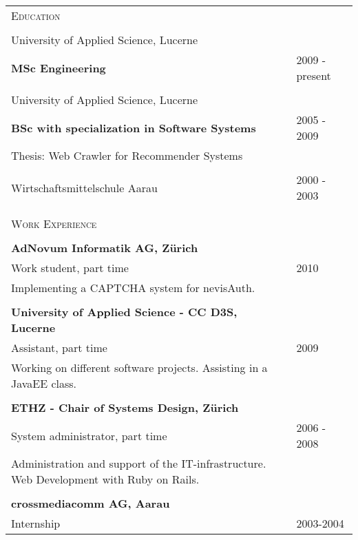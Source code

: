 \begin{table}[H]
    \centering
    \begin{tabular}{  l  l  }

        \textsc{Education} & \\
        \\
        University of Applied Science, Lucerne & \\
        \textbf{MSc Engineering} & 2009 - present   \\
        
        \\
        
        University of Applied Science, Lucerne & \\
        \textbf{BSc with specialization in Software Systems} & 2005 - 2009 \\
        Thesis: Web Crawler for Recommender Systems & \\
        
        \\
        
        Wirtschaftsmittelschule Aarau & 2000 - 2003 \\
        
        \\
        \\
        
        \textsc{Work Experience} & \\
        
        \\
        
        \textbf{AdNovum Informatik AG, Z\"urich} & \\
        Work student, part time & 2010 \\
        Implementing a CAPTCHA system for nevisAuth. & \\
        
        \\
        
        \textbf{University of Applied Science - CC D3S, Lucerne} & \\
        Assistant, part time & 2009 \\
        Working on different software projects. Assisting in a JavaEE class. & \\
        \\
        
        \textbf{ETHZ - Chair of Systems Design, Z\"urich} & \\
        System administrator, part time & 2006 - 2008\\
        Administration and support of the IT-infrastructure. Web Development with Ruby on Rails. & \\
        
        \\
        
        \textbf{crossmediacomm AG, Aarau} & \\
        Internship & 2003-2004 \\
        
    \end{tabular}
    \label{table:cv}
\end{table}


